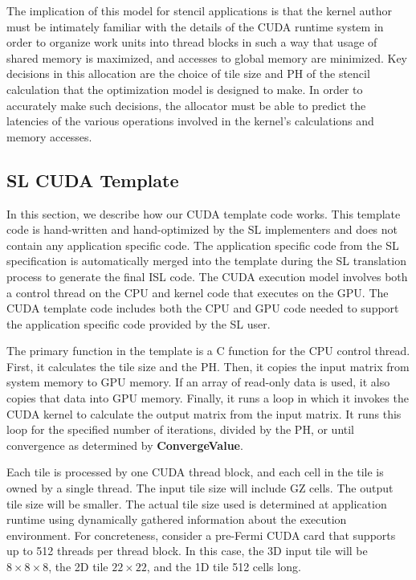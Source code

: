 \documentclass{sig-alternate}
\begin{document}
The implication of this model for stencil applications is that the kernel
author must be intimately familiar with the details of the CUDA runtime
system in order to organize work units into thread blocks in such a way that
usage of shared memory is maximized, and accesses to global memory are
minimized.  Key decisions in this allocation are the choice of tile size and
PH of the stencil calculation that the optimization model is designed to
make.  In order to accurately make such decisions, the allocator must be able
to predict the latencies of the various operations involved in the kernel's
calculations and memory accesses.

\subsection{SL CUDA Template}

In this section, we describe how our CUDA template code works.  This template
code is hand-written and hand-optimized by the SL implementers and does not
contain any application specific code.  The application specific code from
the SL specification is automatically merged into the template during the SL
translation process to generate the final ISL code.  The CUDA execution model
involves both a control thread on the CPU and kernel code that executes on
the GPU.  The CUDA template code includes both the CPU and GPU code needed to
support the application specific code provided by the SL user.

The primary function in the template is a C function for the CPU control
thread.  First, it calculates the tile size and the PH.  Then, it copies the
input matrix from system memory to GPU memory.  If an array of read-only data
is used, it also copies that data into GPU memory.  Finally, it runs a loop
in which it invokes the CUDA kernel to calculate the output matrix from the
input matrix.  It runs this loop for the specified number of iterations,
divided by the PH, or until convergence as determined by {\bf
  ConvergeValue}.

Each tile is processed by one CUDA thread block, and each cell in the tile is
owned by a single thread.  The input tile size will include GZ cells.  The
output tile size will be smaller.  The actual tile size used is determined at
application runtime using dynamically gathered information about the
execution environment.  For concreteness, consider a pre-Fermi CUDA card that
supports up to 512 threads per thread block.  In this case, the 3D input tile
will be $8 \times 8 \times 8$, the 2D tile $22 \times 22$, and the 1D tile
512 cells long.
\end{document}
